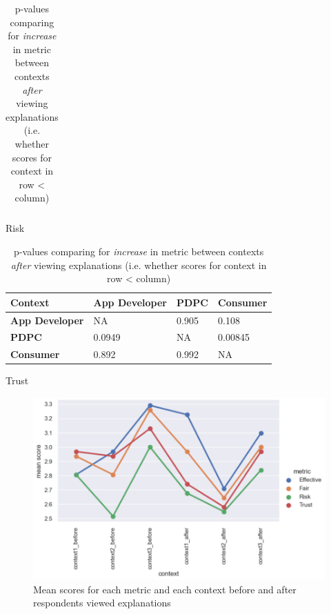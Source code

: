 \begin{table}[!ht]
\begin{subtable}[h]{1\textwidth}
\begin{tabular}{|l|l|l|l|}
    \end{tabular}
  \caption{Risk}
  \label{tab:risk_after}
  \end{subtable}
  \vfill
  \begin{subtable}[h]{1\textwidth}
    \centering
    \begin{tabular}{|l|l|l|l|}
      \hline
      \textbf{Context}       & \textbf{App Developer} & \textbf{PDPC} & \textbf{Consumer} \\ \hline
      \textbf{App Developer} & NA                     & 0.905         & 0.108             \\ \hline
      \textbf{PDPC}          & \cellcolor{red!25}0.0949                 & NA            & \cellcolor{red!25}0.00845           \\ \hline
      \textbf{Consumer}      & 0.892                  & 0.992         & NA                \\ \hline
    \end{tabular}
  \caption{Trust}
  \label{tab:trust_after}
  \end{subtable}
  \caption{p-values comparing for \textit{increase} in metric between contexts \textit{after} viewing explanations (i.e. whether scores for context in row \textless{} column)}
  \label{tab:context_comparison_4}
\end{table}

\begin{figure}[!ht]
  \centering
  \includegraphics[width=1\linewidth]{figures/part2_part6_metric_comparison.png}
  \caption{Mean scores for each metric and each context before and after respondents viewed explanations}
  \label{fig:part2_part6_comparison}
\end{figure}

